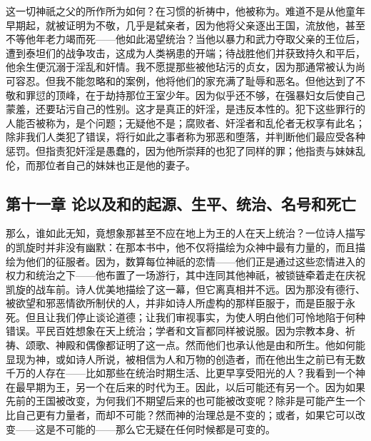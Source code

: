 这一切神祇之父的所作所为如何？在习惯的祈祷中，他被称为。难道不是从他童年早期起，就被证明为不敬，几乎是弑亲者，因为他将父亲逐出王国，流放他，甚至不等他年老力竭而死——他如此渴望统治？当他以暴力和武力夺取父亲的王位后，遭到泰坦们的战争攻击，这成为人类祸患的开端；待战胜他们并获致持久和平后，他余生便沉溺于淫乱和奸情。我不愿提那些被他玷污的贞女，因为那通常被认为尚可容忍。但我不能忽略和的案例，他将他们的家充满了耻辱和恶名。但他达到了不敬和罪愆的顶峰，在于劫持那位王室少年。因为似乎还不够，在强暴妇女后使自己蒙羞，还要玷污自己的性别。这才是真正的奸淫，是违反本性的。犯下这些罪行的人能否被称为，是个问题；无疑他不是；腐败者、奸淫者和乱伦者无权享有此名；除非我们人类犯了错误，将行如此之事者称为邪恶和堕落，并判断他们最应受各种惩罚。但指责犯奸淫是愚蠢的，因为他所崇拜的也犯了同样的罪；他指责与妹妹乱伦，而那位者自己的妹妹也正是他的妻子。\newline{}\par


\subsection{第十一章 论以及和的起源、生平、统治、名号和死亡}

那么，谁如此无知，竟想象那甚至不应在地上为王的人在天上统治？一位诗人描写的凯旋时并非没有幽默：在那本书中，他不仅将描绘为众神中最有力量的，而且描绘为他们的征服者。因为，数算每位神祇的恋情——他们正是通过这些恋情进入的权力和统治之下——他布置了一场游行，其中连同其他神祇，被锁链牵着走在庆祝凯旋的战车前。诗人优美地描绘了这一幕，但它离真相并不远。因为那没有德行、被欲望和邪恶情欲所制伏的人，并非如诗人所虚构的那样臣服于，而是臣服于永死。但且让我们停止谈论道德；让我们审视事实，为使人明白他们可怜地陷于何种错误。平民百姓想象在天上统治；学者和文盲都同样被说服。因为宗教本身、祈祷、颂歌、神殿和偶像都证明了这一点。然而他们也承认他是由和所生。他如何能显现为神，或如诗人所说，被相信为人和万物的创造者，而在他出生之前已有无数千万的人存在——比如那些在统治时期生活、比更早享受阳光的人？我看到一个神在最早期为王，另一个在后来的时代为王。因此，以后可能还有另一个。因为如果先前的王国被改变，为何我们不期望后来的也可能被改变呢？除非是可能产生一个比自己更有力量者，而却不可能？然而神的治理总是不变的；或者，如果它可以改变——这是不可能的——那么它无疑在任何时候都是可变的。\newline{}\par

